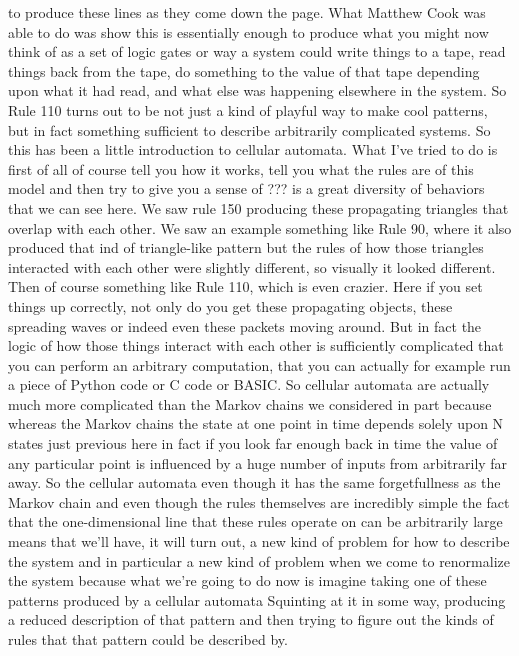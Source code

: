 \documentclass[]{article}
\begin{document}
to produce these lines as they come down the page.
What Matthew Cook was able to do was show
this is essentially enough to produce
what you might now think of
as a set of logic gates
or way a system could
write things to a tape,
read things back from the tape,
do something to the value of that tape
depending upon what it had read,
and what else was happening
elsewhere in the system.
So Rule 110 turns out to be
not just a kind of
playful way to make cool patterns,
but in fact something sufficient to
describe arbitrarily complicated systems.
So this has been a little
introduction to cellular automata.
What I've tried to do is first of all
of course tell you how it works,
tell you what the rules are of this model
and then try to give you a sense of
??? is a great diversity of behaviors
that we can see here.
We saw rule 150 producing these propagating
triangles that overlap with each other.
We saw an example something like Rule 90,
where it also produced that
ind of triangle-like pattern
but the rules of how those
triangles interacted with each other
were slightly different, 
so visually it looked different.
Then of course something like Rule 110,
which is even crazier.
Here if you set things up correctly,
not only do you get these propagating objects,
these spreading waves or indeed even
these packets moving around.
But in fact the logic of how
those things interact with each other
is sufficiently complicated that you
can perform an arbitrary computation,
that you can actually for example run
a piece of Python code or C code or BASIC.
So cellular automata are actually much more
complicated than the Markov chains we considered
in part because whereas the Markov chains
the state at one point in time
depends solely upon N states just previous
here in fact if you look far enough back in time
the value of any particular point
is influenced by a huge number
of inputs from arbitrarily far away.
So the cellular automata even
though it has the same forgetfullness
as the Markov chain
and even though the rules
themselves are incredibly simple
the fact that the one-dimensional
line that these rules operate on
can be arbitrarily large
means that we'll have, it will turn out,
a new kind of problem
for how to describe the system
and in particular a new kind of problem
when we come to renormalize the system
because what we're going to do now
is imagine taking
one of these patterns produced
by a cellular automata
Squinting at it in some way,
producing a reduced description
of that pattern
and then trying to figure out
the kinds of rules
that that pattern
could be described by.
\end{document}
